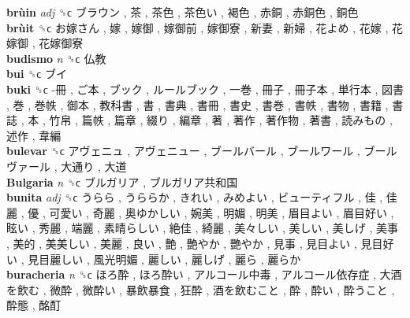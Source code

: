 \textbf{brùin} \emph{adj}  ␝ϲ   ブラウン ,  茶 ,  茶色 ,  茶色い ,  褐色 ,  赤銅 ,  赤銅色 ,  銅色   \\
\textbf{brùit} ␝ϲ   お嫁さん ,  嫁 ,  嫁御 ,  嫁御前 ,  嫁御寮 ,  新妻 ,  新婦 ,  花よめ ,  花嫁 ,  花嫁御 ,  花嫁御寮   \\
\textbf{budismo} \emph{n}  ␝ϲ   仏教   \\
\textbf{bui} ␝ϲ   ブイ   \\
\textbf{buki} ␝ϲ   -冊 ,  ご本 ,  ブック ,  ルールブック ,  一巻 ,  冊子 ,  冊子本 ,  単行本 ,  図書 ,  巻 ,  巻帙 ,  御本 ,  教科書 ,  書 ,  書典 ,  書冊 ,  書史 ,  書巻 ,  書帙 ,  書物 ,  書籍 ,  書誌 ,  本 ,  竹帛 ,  篇帙 ,  篇章 ,  綴り ,  編章 ,  著 ,  著作 ,  著作物 ,  著書 ,  読みもの ,  述作 ,  韋編   \\
\textbf{bulevar} ␝ϲ   アヴェニュ ,  アヴェニュー ,  ブールバール ,  ブールワール ,  ブールヴァール ,  大通り ,  大道   \\
\textbf{Bulgaria} \emph{n}  ␝ϲ   ブルガリア ,  ブルガリア共和国   \\
\textbf{bunita} \emph{adj}  ␝ϲ   うらら ,  うららか ,  きれい ,  みめよい ,  ビューティフル ,  佳 ,  佳麗 ,  優 ,  可愛い ,  奇麗 ,  奥ゆかしい ,  婉美 ,  明媚 ,  明美 ,  眉目よい ,  眉目好い ,  眩い ,  秀麗 ,  端麗 ,  素晴らしい ,  絶佳 ,  綺麗 ,  美々しい ,  美しい ,  美しげ ,  美事 ,  美的 ,  美美しい ,  美麗 ,  良い ,  艶 ,  艶やか ,  艷やか ,  見事 ,  見目よい ,  見目好い ,  見目麗しい ,  風光明媚 ,  麗しい ,  麗しげ ,  麗ら ,  麗らか   \\
\textbf{buracheria} \emph{n}  ␝ϲ   ほろ酔 ,  ほろ酔い ,  アルコール中毒 ,  アルコール依存症 ,  大酒を飲む ,  微酔 ,  微酔い ,  暴飲暴食 ,  狂酔 ,  酒を飲むこと ,  酔 ,  酔い ,  酔うこと ,  酔態 ,  酩酊   \\
